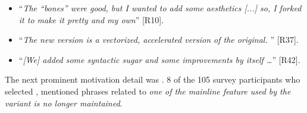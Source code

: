 \begin{itemize}[leftmargin=*]
\item ``\emph{The ``bones'' were good, but I wanted to add some aesthetics [...]%
so, I forked it to make it pretty and my own}'' [R10].
\item ``\emph{The new version is a vectorized, accelerated version of the original.%
}'' [R37].
\item ``\emph{[We] added some syntactic sugar and some improvements by itself \ldots}'' [R42].
\end{itemize}

\nd The next prominent  motivation detail was .
8 of the 105 survey participants who selected , mentioned phrases related to \emph{one of the mainline feature used by the variant is no longer maintained}.

